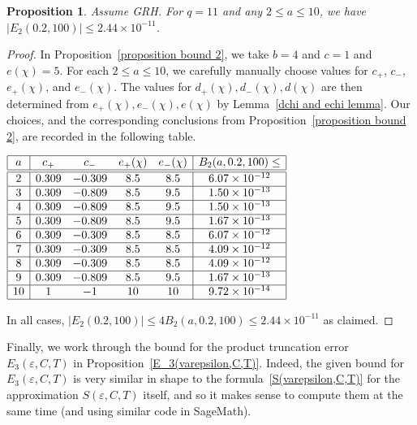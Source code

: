 \documentclass[11pt]{article}
\theoremstyle{plain}
\newtheorem{prop}[thm]{Proposition}
\theoremstyle{definition}
\numberwithin{equation}{section}
\newcommand{\0}{{\vec 0}}
\begin{document}
\begin{prop} \label{bound E2}
Assume GRH. For $q=11$ and any $2\le a\le 10$, we have $|E_2(0.2,100)| \le 2.44\times 10^{-11}$.
\end{prop}

\begin{proof}
In Proposition~\ref{proposition bound 2},
we take $b=4$ and $c=1$ and $e(\chi)=5$.
For each $2\le a\le10$,
we carefully manually choose values for $c_+$, $c_-$, $e_+(\chi)$, and $e_-(\chi)$. The values for $d_+(\chi),d_-(\chi),d(\chi)$ are then determined from $e_+(\chi),e_-(\chi),e(\chi)$
by Lemma~\ref{dchi and echi lemma}. Our choices, and the corresponding conclusions from Proposition~\ref{proposition bound 2}, are recorded in the following table.
\begin{center}$
\begin{array}{|c | c c c c | c |} 
\hline
a & c_+ & c_- & e_+(\chi) & e_-(\chi) & B_2(a,0.2,100)\le \\
\hline\hline
2 & 0.309 & -0.309 & 8.5 & 8.5 & 6.07\times 10^{-12} \\ 
\hline
3 & 0.309 & -0.809 & 8.5 & 9.5 & 1.50\times 10^{-13} \\ 
\hline
4 & 0.309 & -0.809 & 8.5 & 9.5 & 1.50\times 10^{-13} \\ 
\hline
5 & 0.309 & -0.809 & 8.5 & 9.5 & 1.67\times 10^{-13} \\ 
\hline
6 & 0.309 & -0.309 & 8.5 & 8.5 & 6.07\times 10^{-12} \\ 
\hline
7 & 0.309 & -0.309 & 8.5 & 8.5 & 4.09\times 10^{-12} \\ 
\hline
8 & 0.309 & -0.309 & 8.5 & 8.5 & 4.09\times 10^{-12} \\ 
\hline
9 & 0.309 & -0.809 & 8.5 & 9.5 & 1.67\times 10^{-13} \\ 
\hline
10 & 1 & -1 & 10 & 10 & 9.72\times 10^{-14} \\
\hline
\end{array}
$\end{center}
In all cases, $|E_2(0.2,100)|\le 4B_2(a,0.2,100) \le 2.44\times 10^{-11}$ as claimed.
\end{proof}

Finally, we work through the bound for the product truncation error $E_3(\varepsilon,C,T)$ in Proposition~\ref{E_3(varepsilon,C,T)}. Indeed, the given bound for $E_3(\varepsilon,C,T)$ is very similar in shape to the formula~\eqref{S(varepsilon,C,T)} for the approximation $S(\varepsilon,C,T)$ itself, and so it makes sense to compute them at the same time (and using similar code in SageMath).
\end{document}
